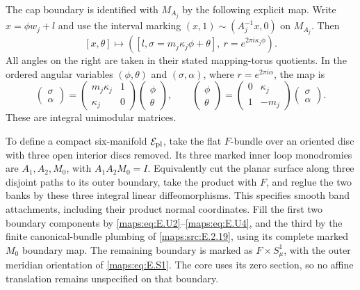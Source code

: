 \begin{proposition}
The cap boundary is identified with $M_{A_j}$ by the following
explicit map.  Write $x=\phi w_j+l$ and use the interval marking
$(x,1)\sim(A_j^{-1}x,0)$ on $M_{A_j}$.  Then
\[
 [x,\theta]\longmapsto
 \left([l,\sigma=m_j\kappa_j\phi+\theta],
                         \ r=e^{2\pi i\kappa_j\phi}\right).
 \tag{E.U3}\label{maps:eq:E.U3}
\]
All angles on the right are taken in their stated mapping-torus
quotients.  In the ordered angular variables $(\phi,\theta)$
and $(\sigma,\alpha)$, where $r=e^{2\pi i\alpha}$, the map is
\[
 \begin{pmatrix}\sigma\\\alpha\end{pmatrix}
 =
 \begin{pmatrix}m_j\kappa_j&1\\\kappa_j&0\end{pmatrix}
 \begin{pmatrix}\phi\\\theta\end{pmatrix},
 \qquad
 \begin{pmatrix}\phi\\\theta\end{pmatrix}
 =
 \begin{pmatrix}0&\kappa_j\\1&-m_j\end{pmatrix}
 \begin{pmatrix}\sigma\\\alpha\end{pmatrix}.
 \tag{E.U4}\label{maps:eq:E.U4}
\]
These are integral unimodular matrices.

To define a compact six-manifold $\mathcal E_{\rm pl}$, take the
flat $F$-bundle over an oriented disc with three open interior
discs removed.  Its three marked inner loop monodromies are
$A_1,A_2,M_0$, with $A_1A_2M_0=I$.  Equivalently cut the planar
surface along three disjoint paths to its outer boundary, take
the product with $F$, and reglue the two banks by these three
integral linear diffeomorphisms.  This specifies smooth band
attachments, including their product normal coordinates.
Fill the first two boundary components by \eqref{maps:eq:E.U2}--\eqref{maps:eq:E.U4}, and
the third by the finite canonical-bundle plumbing of \ref{maps:src:E.2.19},
using its complete marked $M_0$ boundary map.  The remaining
boundary is marked as $F\times S^1_\mu$, with the outer meridian
orientation of \eqref{maps:eq:E.S1}.  The core uses its zero section, so no
affine translation remains unspecified on that boundary.


\end{proposition}
